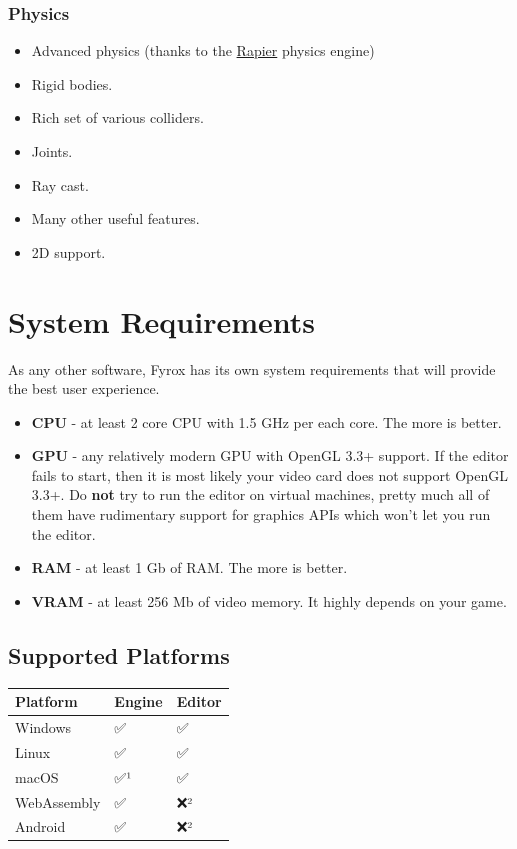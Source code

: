 \documentclass[
]{book}
\providecommand{\tightlist}{%
  \setlength{\itemsep}{0pt}\setlength{\parskip}{0pt}}
\theoremstyle{definition}
\theoremstyle{definition}
\theoremstyle{definition}
\theoremstyle{definition}
\theoremstyle{remark}
\begin{document}
\subsubsection{Physics}\label{physics}

\begin{itemize}
\tightlist
\item
  Advanced physics (thanks to the \href{https://github.com/dimforge/rapier}{Rapier} physics engine)
\item
  Rigid bodies.
\item
  Rich set of various colliders.
\item
  Joints.
\item
  Ray cast.
\item
  Many other useful features.
\item
  2D support.
\end{itemize}

\section{System Requirements}\label{system-requirements}

As any other software, Fyrox has its own system requirements that will provide the best user experience.

\begin{itemize}
\tightlist
\item
  \textbf{CPU} - at least 2 core CPU with 1.5 GHz per each core. The more is better.
\item
  \textbf{GPU} - any relatively modern GPU with OpenGL 3.3+ support. If the editor fails to start, then it is most likely your video card does not support OpenGL 3.3+. Do \textbf{not} try to run the editor on virtual machines, pretty much all of them have rudimentary support for graphics APIs which won't let you run the editor.
\item
  \textbf{RAM} - at least 1 Gb of RAM. The more is better.
\item
  \textbf{VRAM} - at least 256 Mb of video memory. It highly depends on your game.
\end{itemize}

\subsection{Supported Platforms}\label{supported-platforms}

\begin{longtable}[]{@{}lll@{}}
\toprule\noalign{}
Platform & Engine & Editor \\
\midrule\noalign{}
\endhead
\bottomrule\noalign{}
\endlastfoot
Windows & ✅ & ✅ \\
Linux & ✅ & ✅ \\
macOS & ✅¹ & ✅ \\
WebAssembly & ✅ & ❌² \\
Android & ✅ & ❌² \\
\end{longtable}
\end{document}
